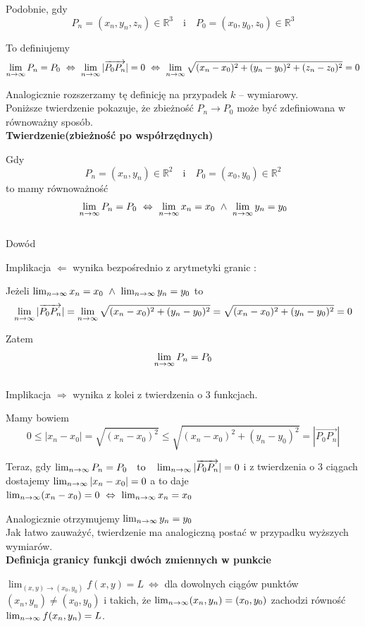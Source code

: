 Podobnie, gdy
$$ P_n = (x_n, y_n, z_n) \in \mathbb{R}^3 \quad \textrm{i} \quad P_0 = (x_0, y_0, z_0) \in \mathbb{R}^3 $$

To definiujemy
$$ \limn P_n = P_0 \ \Leftrightarrow \ \limn |\overrightarrow{P_0 P_n}| = 0
\ \Leftrightarrow \ \limn \sqrt{(x_n - x_0)^2 + (y_n - y_0)^2 + (z_n - z_0)^2} = 0 $$

Analogicznie rozszerzamy tę definicję na przypadek $k$ -- wymiarowy. \\

Poniższe twierdzenie pokazuje, że zbieżność $ P_n \to P_0 $ może być zdefiniowana w równoważny sposób. \\

\textbf{Twierdzenie(zbieżność po współrzędnych)}

Gdy
$$ P_n = (x_n, y_n) \in \mathbb{R}^2 \quad \textrm{i} \quad P_0 = (x_0, y_0) \in \mathbb{R}^2 $$
to mamy równoważność
$$ \limn P_n = P_0 \ \Leftrightarrow \ \limn x_n = x_0 \ \land \ \limn y_n = y_0 $$ \\

Dowód 

Implikacja $ \Leftarrow $ wynika bezpośrednio z arytmetyki granic :

Jeżeli $ \lim_{n \to \infty} x_n = x_0 \ \land \ \lim_{n \to \infty} y_n = y_0 $ to
$$ \lim_{n \to \infty} |\overrightarrow{P_0 P_n}| = \lim_{n \to \infty} \sqrt{(x_n - x_0)^2 + (y_n - y_0)^2} = \sqrt{(x_n - x_0)^2 + (y_n - y_0)^2} = 0 $$

Zatem
$$ \lim_{n \to \infty} P_n = P_0 $$ \\

Implikacja $ \Rightarrow $ wynika z kolei z twierdzenia o 3 funkcjach. 

Mamy bowiem
$$ 0 \leq |x_n - x_0| = \sqrt{(x_n - x_0)^2} \leq \sqrt{(x_n - x_0)^2 + (y_n - y_0)^2} = |\overrightarrow{P_0 P_n}| $$

Teraz, gdy $ \lim_{n \to \infty} P_n = P_0 \quad \textrm{to} \quad \lim_{n \to \infty} |\overrightarrow{P_0 P_n}| = 0 $
i z twierdzenia o 3 ciągach dostajemy $ \lim_{n \to \infty} |x_n - x_0| = 0 $ a to daje
$ \lim_{n \to \infty} (x_n - x_0) = 0 \ \Leftrightarrow \ \lim_{n \to \infty} x_n = x_0 $

Analogicznie otrzymujemy $ \lim_{n \to \infty} y_n = y_0 $ \\

Jak łatwo zauważyć, twierdzenie ma analogiczną postać w przypadku wyższych wymiarów. \\

\textbf{Definicja granicy funkcji dwóch zmiennych w punkcie}

$ \lim_{(x,y) \to (x_0,y_0)} f(x,y) = L \ \Leftrightarrow $ dla dowolnych ciągów punktów $ (x_n, y_n) \neq (x_0, y_0) $
i takich, że $ \lim_{n \to \infty} (x_n, y_n) = (x_0, y_0) $ zachodzi równość $ \lim_{n \to \infty} f(x_n, y_n) = L $. \\

